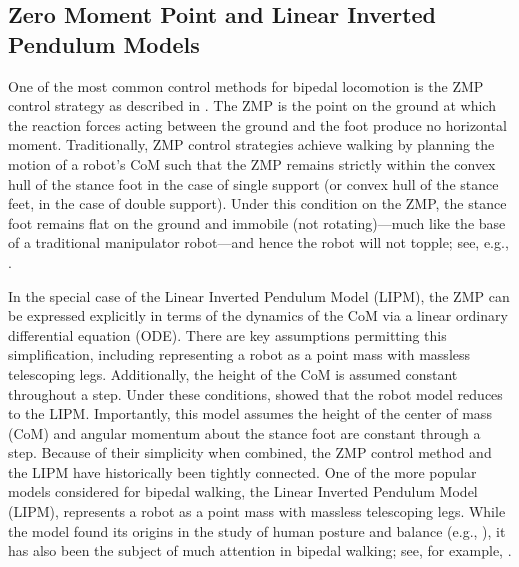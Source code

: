 \subsection{Zero Moment Point and Linear Inverted Pendulum Models}

One of the most common control methods for bipedal locomotion is the ZMP control
strategy as described in \cite{Vukobratovic2004, Vukobratovic1990}.
%
The ZMP is the point on the ground at which the reaction forces acting between
the ground and the foot produce no horizontal moment.
%
Traditionally, ZMP control strategies achieve walking by planning the motion of
a robot's CoM such that the ZMP remains strictly within the convex hull of the
stance foot in the case of single support (or convex hull of the stance feet, in
the case of double support).
%
Under this condition on the ZMP, the stance foot remains flat on the ground and
immobile (not rotating)---much like the base of a traditional manipulator
robot---and hence the robot will not topple; see, e.g., \cite{Yamaguchi1999}.

In the special case of the Linear Inverted Pendulum Model (LIPM),
%
%
the ZMP can be expressed explicitly in terms of the dynamics of the CoM via a
linear ordinary differential equation (ODE).
%
There are key assumptions permitting this simplification, including representing
a robot as a point mass with massless telescoping legs.
%
Additionally, the height of the CoM is assumed constant throughout a step.
%
Under these conditions, \cite{Kajita1991} showed that the robot model reduces to
the LIPM.
%
%
Importantly, this model assumes the height of the center of mass (CoM) and
angular momentum about the stance foot are constant through a step.
%
Because of their simplicity when combined, the ZMP control method and the LIPM
have historically been tightly connected.
%
One of the more popular models considered for bipedal walking, the Linear
Inverted Pendulum Model (LIPM), represents a robot as a point mass with massless
telescoping legs.
%
%
%
While the model found its origins in the study of human posture and balance
(e.g., \cite{Geursen1976, Winter1995, Patton1999}), it has also been the subject
of much attention in bipedal walking; see, for example, \cite{Miura1984,
  Kajita2001, Kajita2010}.
%



